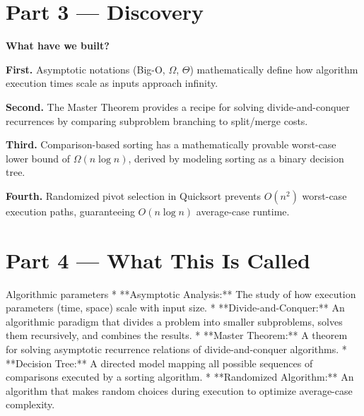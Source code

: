\documentclass[12pt, a4paper]{book}
\begin{document}
\newpage

\section{Part 3 --- Discovery}

\begin{discoverybox}
\textbf{What have we built?}

\textbf{First.} Asymptotic notations (Big-O, $\Omega$, $\Theta$) mathematically define how algorithm execution times scale as inputs approach infinity.

\textbf{Second.} The Master Theorem provides a recipe for solving divide-and-conquer recurrences by comparing subproblem branching to split/merge costs.

\textbf{Third.} Comparison-based sorting has a mathematically provable worst-case lower bound of $\Omega(n \log n)$, derived by modeling sorting as a binary decision tree.

\textbf{Fourth.} Randomized pivot selection in Quicksort prevents $O(n^2)$ worst-case execution paths, guaranteeing $O(n \log n)$ average-case runtime.
\end{discoverybox}

\newpage

\section{Part 4 --- What This Is Called}

\begin{namedconcept}{Algorithmic parameters}
* **Asymptotic Analysis:** The study of how execution parameters (time, space) scale with input size.
* **Divide-and-Conquer:** An algorithmic paradigm that divides a problem into smaller subproblems, solves them recursively, and combines the results.
* **Master Theorem:** A theorem for solving asymptotic recurrence relations of divide-and-conquer algorithms.
* **Decision Tree:** A directed model mapping all possible sequences of comparisons executed by a sorting algorithm.
* **Randomized Algorithm:** An algorithm that makes random choices during execution to optimize average-case complexity.
\end{namedconcept}

\newpage

\end{document}
